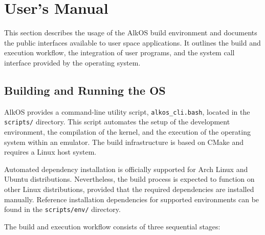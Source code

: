 \documentclass[a4paper,10pt,twoside]{report}
\theoremstyle{definition}
\begin{document}

\chapter{User's Manual}
\label{chap:users_manual}

This section describes the usage of the AlkOS build environment and documents the public interfaces available to user space applications. It outlines the build and execution workflow, the integration of user programs, and the system call interface provided by the operating system.

\section{Building and Running the OS}

AlkOS provides a command-line utility script, \texttt{alkos\_cli.bash}, located in the \texttt{scripts/} directory. This script automates the setup of the development environment, the compilation of the kernel, and the execution of the operating system within an emulator. The build infrastructure is based on CMake and requires a Linux host system.

Automated dependency installation is officially supported for Arch Linux and Ubuntu distributions. Nevertheless, the build process is expected to function on other Linux distributions, provided that the required dependencies are installed manually. Reference installation dependencies for supported environments can be found in the \texttt{scripts/env/} directory.

The build and execution workflow consists of three sequential stages:
\end{document}
